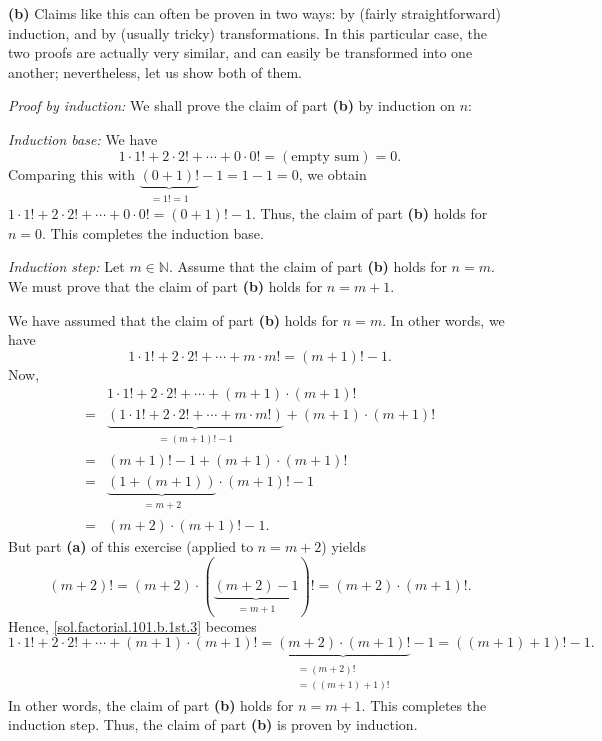 \documentclass[paper=a4, fontsize=12pt]{scrartcl} %
\newcommand{\NN}{\mathbb{N}} %
\newcommand{\tup}[1]{\left( #1 \right)}
\newcommand{\underbrack}[2]{\underbrace{#1}_{\substack{#2}}}
\theoremstyle{plainsl}
\theoremstyle{definition}
\theoremstyle{remark}
\begin{document}
\vspace{0.8pc}

\textbf{(b)}
Claims like this can often be proven in two ways:
by (fairly straightforward) induction,
and by (usually tricky) transformations.
In this particular case, the two proofs are actually very
similar, and can easily be transformed into one another;
nevertheless, let us show both of them.

\textit{Proof by induction:} We shall prove the claim of part \textbf{(b)}
by induction on $n$:

\textit{Induction base:} We have
\[
1\cdot 1! + 2\cdot 2! + \cdots + 0\cdot 0!
= \tup{\text{empty sum}} = 0.
\]
Comparing this with $\underbrack{\tup{0+1}!}{=1!=1} - 1 = 1-1 = 0$, we
obtain $1\cdot 1! + 2\cdot 2! + \cdots + 0\cdot 0! = \tup{0+1}! - 1$. Thus,
the claim of part \textbf{(b)} holds for $n = 0$.
This completes the induction base.

\textit{Induction step:} Let $m \in \NN$.
Assume that the claim of part \textbf{(b)} holds for $n = m$.
We must prove that the claim of part \textbf{(b)} holds for $n = m+1$.

We have assumed that the claim of part \textbf{(b)} holds for $n = m$.
In other words, we have
\[
1\cdot 1! + 2\cdot 2! + \cdots + m\cdot m! = \tup{m+1}! - 1.
\]
Now,
\begin{align}
  & 1\cdot 1! + 2\cdot 2! + \cdots + \tup{m+1}\cdot \tup{m+1}!
    \nonumber \\
= & \underbrack{\tup{ 1\cdot 1! + 2\cdot 2! + \cdots + m\cdot m! } }{= \tup{m+1}! - 1}
     + \tup{m+1} \cdot \tup{m+1}!  \nonumber \\
= & \tup{m+1}! - 1 + \tup{m+1} \cdot \tup{m+1}!  \nonumber \\
= & \underbrack{\tup{1 + \tup{m+1}}}{= m+2} \cdot \tup{m+1}! - 1
    \nonumber \\
= & \tup{m+2} \cdot \tup{m+1}! - 1.
\label{sol.factorial.101.b.1st.3}
\end{align}
But part \textbf{(a)} of this exercise (applied to $n = m+2$) yields
\[
\tup{m+2}!
= \tup{m+2} \cdot \tup{ \underbrack{ \tup{m+2}-1 }{= m+1} }!
= \tup{m+2} \cdot \tup{m+1}!.
\]
Hence, \eqref{sol.factorial.101.b.1st.3} becomes
\[
1\cdot 1! + 2\cdot 2! + \cdots + \tup{m+1}\cdot \tup{m+1}!
= \underbrack{\tup{m+2} \cdot \tup{m+1}!}{\substack{ = \tup{m+2}! \\
                        = \tup{ \tup{m+1}+1 } !}}
  - 1
= \tup{ \tup{m+1} + 1 }! - 1 .
\]
In other words, the claim of part \textbf{(b)} holds for $n = m+1$.
This completes the induction step.
Thus, the claim of part \textbf{(b)} is proven by induction.
\end{document}
